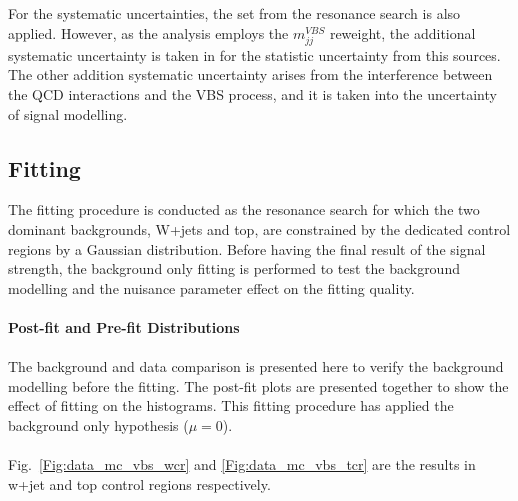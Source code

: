 For the systematic uncertainties, the set from the resonance search is also applied. However, as the analysis employs the $m^{VBS}_{jj}$ reweight, the additional systematic uncertainty is taken in for the statistic uncertainty from this sources. The other addition systematic uncertainty arises from the interference between the QCD interactions and the VBS process, and it is taken into the uncertainty of signal modelling. 

\subsection{Fitting}
The fitting procedure is conducted as the resonance search for which the two dominant backgrounds, W+jets and top, are constrained by the dedicated control regions by a Gaussian distribution. Before having the final result of the signal strength, the background only fitting is performed to test the background modelling and the nuisance parameter effect on the fitting quality.
\\
\\{\bf Post-fit and Pre-fit Distributions} 
\\
\\The background and data comparison is presented here to verify the background modelling before the fitting. The post-fit plots are presented together to show the effect of fitting on the histograms. This fitting procedure has applied the background only hypothesis ($\mu=0$).
\\
\\Fig.~\ref{Fig:data_mc_vbs_wcr} and \ref{Fig:data_mc_vbs_tcr} are the results in w+jet and top control regions respectively. 
